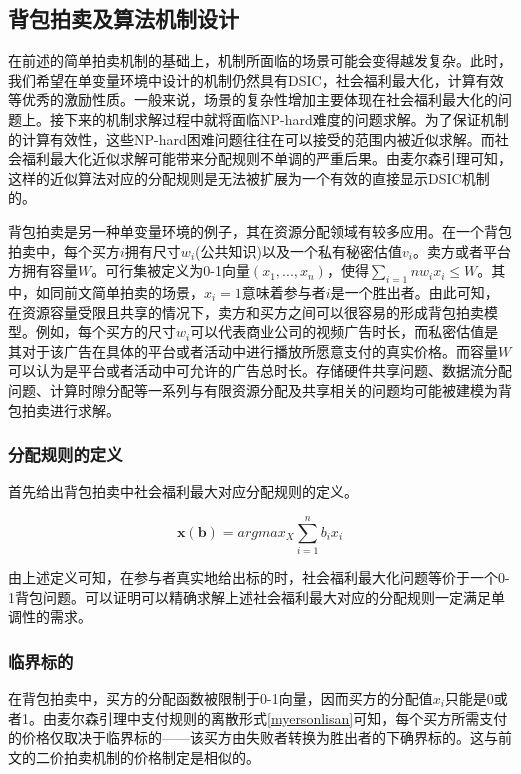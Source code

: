 \documentclass[promaster]{thesis-uestc}
\begin{document}
\subsection{背包拍卖及算法机制设计}
在前述的简单拍卖机制的基础上，机制所面临的场景可能会变得越发复杂。此时，我们希望在单变量环境中设计的机制仍然具有DSIC，社会福利最大化，计算有效等优秀的激励性质。一般来说，场景的复杂性增加主要体现在社会福利最大化的问题上。接下来的机制求解过程中就将面临NP-hard难度的问题求解。为了保证机制的计算有效性，这些NP-hard困难问题往往在可以接受的范围内被近似求解。而社会福利最大化近似求解可能带来分配规则不单调的严重后果。由麦尔森引理可知，这样的近似算法对应的分配规则是无法被扩展为一个有效的直接显示DSIC机制的。

背包拍卖是另一种单变量环境的例子，其在资源分配领域有较多应用。在一个背包拍卖中，每个买方$i$拥有尺寸$w_i$(公共知识)以及一个私有秘密估值$v_i$。卖方或者平台方拥有容量$W$。可行集被定义为0-1向量$(x_1,...,x_n)$，使得$\sum_{i=1}{n}{w_ix_i}\leq W$。其中，如同前文简单拍卖的场景，$x_i=1$意味着参与者$i$是一个胜出者。由此可知，在资源容量受限且共享的情况下，卖方和买方之间可以很容易的形成背包拍卖模型。例如，每个买方的尺寸$w_i$可以代表商业公司的视频广告时长，而私密估值是其对于该广告在具体的平台或者活动中进行播放所愿意支付的真实价格。而容量$W$可以认为是平台或者活动中可允许的广告总时长。存储硬件共享问题、数据流分配问题、计算时隙分配等一系列与有限资源分配及共享相关的问题均可能被建模为背包拍卖进行求解。
\subsubsection{分配规则的定义}
首先给出背包拍卖中社会福利最大对应分配规则的定义。
\begin{definition}[背包拍卖对应的分配规则]
    $$\mathbf{x(b)}=argmax_X{\sum_{i=1}^{n}{b_ix_i}}$$
\end{definition}
由上述定义可知，在参与者真实地给出标的时，社会福利最大化问题等价于一个0-1背包问题。可以证明可以精确求解上述社会福利最大对应的分配规则一定满足单调性的需求。
\subsubsection{临界标的}
在背包拍卖中，买方的分配函数被限制于0-1向量，因而买方的分配值$x_i$只能是0或者1。由麦尔森引理中支付规则的离散形式\ref{myersonlisan}可知，每个买方所需支付的价格仅取决于临界标的——该买方由失败者转换为胜出者的下确界标的。这与前文的二价拍卖机制的价格制定是相似的。
\end{document}
